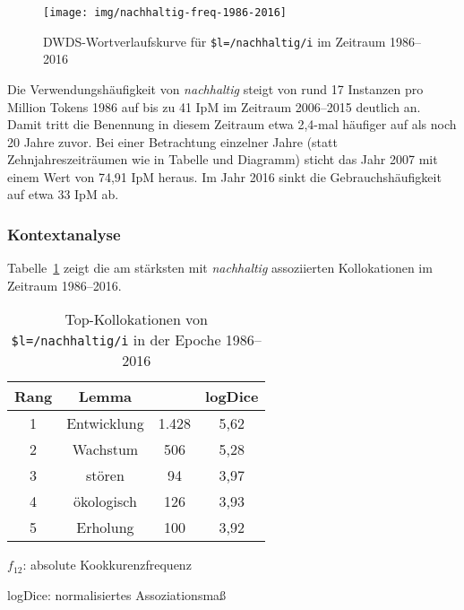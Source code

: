 \documentclass[
    german,
    a4paper,%
    12pt,%
    oneside,%
    toc=bibliography,
    final,
]{scrartcl}
\begin{document}
\begin{figure}[h!]
	\centering
	
	\texttt{[image: img/nachhaltig-freq-1986-2016]}
	\caption[corpus-size]{DWDS-Wortverlaufskurve für \lstinline|$l=/nachhaltig/i| im Zeitraum 1986–2016\protect\footnotemark}
	\label{fig:nachhaltig-freq-1986-2016}
\end{figure}

Die Verwendungshäufigkeit von \textit{nachhaltig} steigt von rund 17 Instanzen pro Million Tokens 1986 auf bis zu 41 IpM im Zeitraum 2006–2015 deutlich an. Damit tritt die Benennung in diesem Zeitraum etwa 2,4-mal häufiger auf als noch 20 Jahre zuvor. Bei einer Betrachtung einzelner Jahre (statt Zehnjahreszeiträumen wie in Tabelle und Diagramm) sticht das Jahr 2007 mit einem Wert von 74,91 IpM heraus. Im Jahr 2016 sinkt die Gebrauchshäufigkeit auf etwa 33 IpM ab.

\subsubsection{Kontextanalyse}


Tabelle~\ref{tab:kollokationen-epoche4} zeigt die am stärksten mit \textit{nachhaltig} assoziierten Kollokationen im Zeitraum 1986–2016.

\begin{table}[h!]
	\centering
	\renewcommand{\arraystretch}{1.5}
	
	\caption{Top-Kollokationen von \lstinline|$l=/nachhaltig/i| in der Epoche 1986–2016\protect\footnotemark}
	\label{tab:kollokationen-epoche4}
	
	\begin{threeparttable}
	
	\begin{tabular}{cccc}
	\textbf{Rang} & \textbf{Lemma} & \boldmath{$f_{12}$} & \textbf{logDice} \\ \hline
	1 & Entwicklung & 1.428 & 5,62 \\ \hline
	2 & Wachstum & 506 & 5,28 \\ \hline
	3 & stören & 94 & 3,97 \\ \hline
	4 & ökologisch & 126 & 3,93 \\ \hline
	5 & Erholung & 100 & 3,92 \\ \hline
	\end{tabular} 
	
	\begin{tablenotes}
	\footnotesize
	\setlength{\itemindent}{-1.2em}
	\item $f_{12}$: absolute Kookkurenzfrequenz
	\item logDice: normalisiertes Assoziationsmaß
	\end{tablenotes}
	
	\end{threeparttable}
\end{table}
\end{document}
